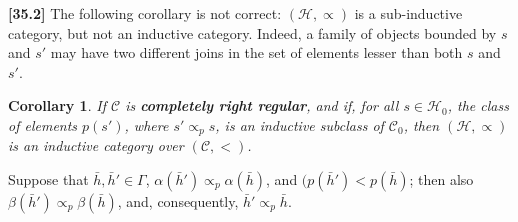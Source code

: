 \documentclass[a4paper,fleqn]{article}
\theoremstyle{plain}
\newenvironment{proposition}[1]
  {\renewcommand\theinnerproposition{#1}\innerproposition}
  {\endinnerproposition}
\newtheorem*{corollary*}{Corollary}
\theoremstyle{definition}
\newenvironment{longcomm}[1]
  {\noindent\textbf{[#1]}\rmfamily}
  {}
\newcommand{\unsure}[1]{{\color{purple}\textbf{#1}}}
\newcommand{\CC}{\mathcal{C}}
\newcommand{\HH}{\mathcal{H}}
\newcommand{\subs}{\mathrel{\propto}}
\begin{document}
\begin{longcomm}{35.2}
  The following corollary is not correct: $(\HH,\subs)$ is a sub-inductive category, but not an inductive category.
  Indeed, a family of objects bounded by $s$ and $s'$ may have two different joins in the set of elements lesser than both $s$ and $s'$.
\end{longcomm}

\begin{corollary*}
  If $\CC$ is \unsure{completely right regular}, and if, for all $s\in\HH_0$, the class of elements $p(s')$, where $s'\subs_p s$, is an inductive subclass of $\CC_0$, then $(\HH,\subs)$ is an inductive category over $(\CC,<)$.
\end{corollary*}

\begin{proposition}{6}
\label{proposition:i-6}
  Suppose that $\bar{h},\bar{h}'\in\Gamma$, $\alpha(\bar{h}')\subs_p\alpha(\bar{h})$, and $(p(\bar{h}')<p(\bar{h})$;
  then also $\beta(\bar{h}')\subs_p\beta(\bar{h})$, and, consequently, $\bar{h}'\subs_p\bar{h}$.
\end{proposition}
\end{document}
